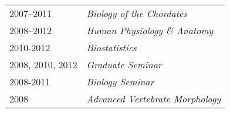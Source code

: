 \begin{longtable}{@{}lX@{}}
    2007--2011 & \textit{Biology of the Chordates}\\
    2008--2012 & \textit{Human Physiology \& Anatomy}\\
    2010-2012 & \textit{Biostatistics}\\
    2008, 2010, 2012 & \textit{Graduate Seminar}\\
    2008-2011 & \textit{Biology Seminar}\\
    2008 & \textit{Advanced Vertebrate Morphology}
\end{longtable}
